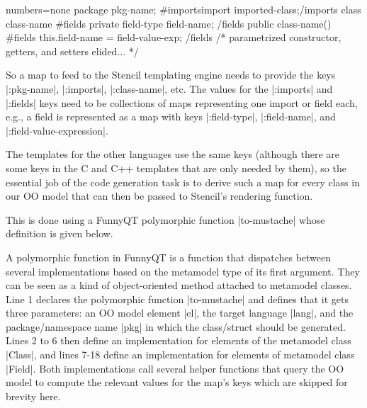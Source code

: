 \documentclass[submission]{eptcs}
\newcommand{\code}{\clojureinline}
\begin{document}
\begin{javacode*}{numbers=none}
package {{{pkg-name}}};
{{#imports}}import {{{imported-class}}};{{/imports}}
class {{{class-name}}} {
    {{#fields}}
    private {{{field-type}}} {{{field-name}}};
    {{/fields}}
    public {{{class-name}}}() {
        {{#fields}}
        this.{{{field-name}}} = {{{field-value-exp}}};
        {{/fields}}
    } /* parametrized constructor, getters, and setters elided... */ }

\end{javacode*}

So a map to feed to the Stencil templating engine needs to provide the keys
\code|:pkg-name|, \code|:imports|, \code|:class-name|, etc.  The values for the
\code|:imports| and \code|:fields| keys need to be collections of maps
representing one import or field each, e.g., a field is represented as a map
with keys \code|:field-type|, \code|:field-name|, and
\code|:field-value-expression|.

The templates for the other languages use the same keys (although there are
some keys in the C and C++ templates that are only needed by them), so the
essential job of the code generation task is to derive such a map for every
class in our OO model that can then be passed to Stencil's rendering function.

This is done using a FunnyQT polymorphic function \code|to-mustache| whose
definition is given below.


A polymorphic function in FunnyQT is a function that dispatches between several
implementations based on the metamodel type of its first argument.  They can be
seen as a kind of object-oriented method attached to metamodel classes.  Line 1
declares the polymorphic function \code|to-mustache| and defines that it gets
three parameters: an OO model element \code|el|, the target language
\code|lang|, and the package/namespace name \code|pkg| in which the
class/struct should be generated.  Lines 2 to 6 then define an implementation
for elements of the metamodel class \code|Class|, and lines 7-18 define an
implementation for elements of metamodel class \code|Field|.  Both
implementations call several helper functions that query the OO model to
compute the relevant values for the map's keys which are skipped for brevity
here.
\end{document}
